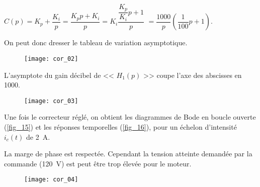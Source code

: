 \begin{multicols}{2}
\ifprof
\begin{corrige}

$C(p)=K_p+\dfrac{K_i}{p}=\dfrac{K_p p + K_i}{p} = K_i \dfrac{\dfrac{K_p}{K_i} p +1 }{p}$
$=\dfrac{1000}{p}\left(\dfrac{1}{100}p+1\right)$. 

On peut donc dresser le tableau de variation asymptotique.

\begin{figure}[H]
\centering
\texttt{[image: cor\_02]}
\end{figure}

L'asymptote du gain décibel de << $H_1(p)$ >> coupe l'axe des abscisses en 1000.

\begin{figure}[H]
\centering
\texttt{[image: cor\_03]}
\end{figure}


\end{corrige}
\else
\fi


%
%

\ifprof
\else
 Une fois le correcteur réglé, on obtient les diagrammes de Bode en boucle ouverte (\autoref{fig_15}) et les réponses temporelles (\autoref{fig_16}), pour un échelon d’intensité $i_c(t)$ de \SI{2}{A}.
\fi

\ifprof
\begin{corrige}
La marge de phase est respectée. Cependant la tension atteinte demandée par la commande (\SI{120}{V}) est peut être trop élevée pour le moteur. 
\begin{figure}[H]
\centering
\texttt{[image: cor\_04]}
\end{figure}
\end{corrige}
\else
\fi



\end{multicols}
